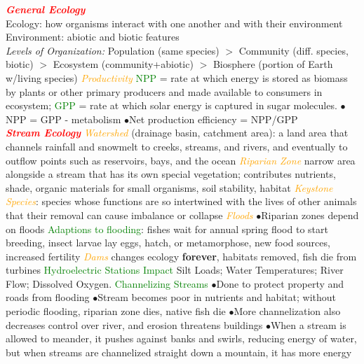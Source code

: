 \documentclass{article}
\author{SBHS Science Olympiad, Tarang}
\newcommand{\ddd}{$\bullet$}
\newcommand{\red}[1]{\textcolor{red}{#1}}
\newcommand{\green}[1]{\textcolor{green}{#1}}
\newcommand{\orange}[1]{\textcolor{orange}{#1}}
\newcommand{\mysection}[1]{\textbf{\textit{\red{#1}}}}
\newcommand{\mysubsection}[1]{{\textit{\orange{#1}}}}
\newcommand{\mysubsub}[1]{{{\green{#1}}}}
\begin{document}
\tiny
\begin{multicols*}{4}
    \noindent
    \mysection{General Ecology} \\
        Ecology: how organisms interact with one another and with their environment \\
        Environment: abiotic and biotic features\\
        \textit{Levels of Organization:} Population (same species) $>$  Community (diff. species, biotic) $>$ Ecosystem (community+abiotic) $>$ Biosphere (portion of Earth w/living species)
        \mysubsection{Productivity}
        \green{NPP} = rate at which energy is stored as biomass by plants or other primary producers and made available to consumers in ecosystem; \green{GPP} = rate at which solar energy is captured in sugar molecules.
        \ddd NPP = GPP - metabolism \ddd Net production efficiency = NPP/GPP
    \\
    \mysection{Stream Ecology}
        \mysubsection{Watershed} (drainage basin, catchment area): a land area that channels rainfall and snowmelt to creeks, streams, and rivers, and eventually to outflow points such as reservoirs, bays, and the ocean
        \mysubsection{Riparian Zone} narrow area alongside a stream that has its own special vegetation; contributes nutrients, shade, organic materials for small organisms, soil stability, habitat
        \mysubsection{Keystone Species}:  species whose functions are so intertwined with the lives of other animals that their removal can cause imbalance or collapse
        \mysubsection{Floods}
            \ddd Riparian zones depend on floods
            \mysubsub{Adaptions to flooding}: fishes wait for annual spring flood to start breeding, insect larvae lay eggs, hatch, or metamorphose, new food sources, increased fertility
        \mysubsection{Dams}
            changes ecology \textbf{forever}, habitats removed, fish die from turbines
            \mysubsub{Hydroelectric Stations Impact}
                Silt Loads; Water Temperatures; River Flow; Dissolved Oxygen. 
            \mysubsub{Channelizing Streams}
                \ddd Done to protect property and roads from flooding
                \ddd Stream becomes poor in nutrients and habitat; without periodic flooding, riparian zone dies, native fish die
                \ddd More channelization also decreases control over river, and erosion threatens buildings
                \ddd When a stream is allowed to meander, it pushes against banks and swirls, reducing energy of water, but when streams are channelized straight down a mountain, it has more energy

\end{multicols*}
\end{document}
